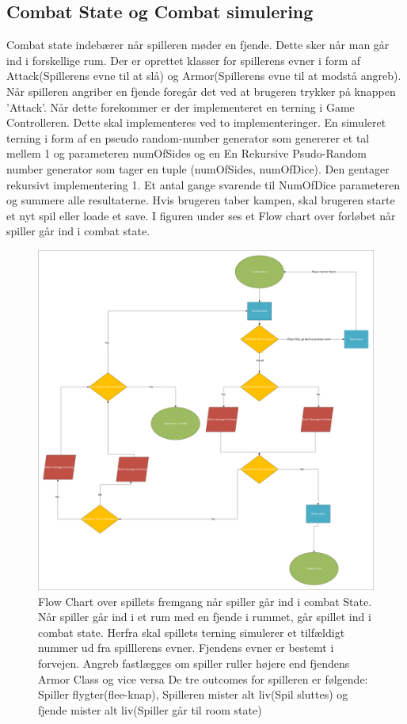\subsection{Combat State og Combat simulering}
Combat state indebærer når spilleren møder en fjende. Dette sker når man går ind i forskellige rum. Der er oprettet klasser for spillerens evner i form af Attack(Spillerens evne til at slå) og Armor(Spillerens evne til at modstå angreb). Når spilleren angriber en fjende foregår det ved at brugeren trykker på knappen ’Attack’. Når dette forekommer er der implementeret en terning i Game Controlleren. Dette skal implementeres ved to implementeringer. En simuleret terning i form af en pseudo random-number generator som genererer et tal mellem 1 og parameteren numOfSides og en  En Rekursive Psudo-Random number generator som tager en tuple (numOfSides, numOfDice). Den gentager rekursivt implementering 1. Et antal gange svarende til NumOfDice parameteren og summere alle resultaterne.  Hvis brugeren taber kampen, skal brugeren starte et nyt spil eller loade et save. I figuren under ses et Flow chart over forløbet når spiller går ind i combat state.
\begin{figure}[h]
\centering
\includegraphics[width = \textwidth]{02-Body/Images/Arkitektur - Combat State.pdf}
\caption{Flow Chart over spillets fremgang når spiller går ind i combat State. Når spiller går ind i et rum med en fjende i rummet, går spillet ind i combat state. Herfra skal spillets terning simulerer et tilfældigt nummer ud fra spilllerens evner. Fjendens evner er bestemt i forvejen. Angreb fastlægges om spiller ruller højere end fjendens Armor Class og vice versa De tre outcomes for spilleren er følgende: Spiller flygter(flee-knap), Spilleren mister alt liv(Spil sluttes) og fjende mister alt liv(Spiller går til room state)}
\label{fig:Arkitektur-SD-SaveGame}
\end{figure}

